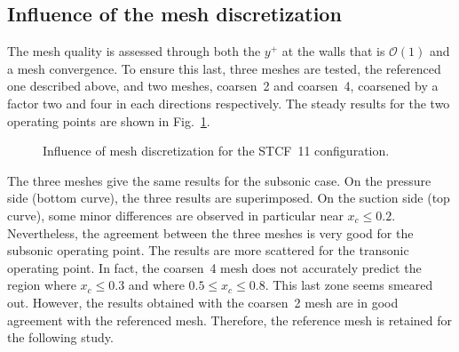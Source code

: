 \subsection{Influence of the mesh discretization}
\label{sub:stcf11_mesh_convergence}
The mesh quality is assessed through both the $y^+$
at the walls that is $\mathcal{O}(1)$ and a mesh convergence.
To ensure this last, three meshes are tested, the referenced one
described above, and two meshes, coarsen~2 and coarsen~4,
coarsened by a factor two and four in each directions respectively.
The steady results for the two operating points are shown 
in Fig.~\ref{fig:stcf11_mesh_convergence}.
\begin{figure}[htb]
  \centering
  \caption{Influence of mesh discretization for the STCF~11 configuration.}
  \label{fig:stcf11_mesh_convergence}
\end{figure}
The three meshes give the same results for the subsonic case. On the
pressure side (bottom curve), the three results are superimposed. On the suction side
(top curve),
some minor differences are observed in particular near
$x_c \leq 0.2$. Nevertheless, the agreement
between the three meshes is very good for the subsonic operating point.
The results are more scattered for the transonic operating point. In fact,
the coarsen~4 mesh does not accurately predict the region where $x_c \leq 0.3$
and where $0.5 \leq x_c \leq 0.8$. This last zone seems smeared out. 
However, the results
obtained with the coarsen~2 mesh are in good agreement with the referenced mesh.
Therefore, the reference mesh is retained for the following study.

